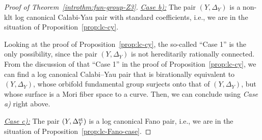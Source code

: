 \documentclass{amsart}
\theoremstyle{definition}
\theoremstyle{remark}
\numberwithin{equation}{section}
\begin{document}
\begin{proof}[Proof of Theorem~\ref{introthm:fun-group-Z3}]

\medskip

\noindent\underline{\textit{Case b):}}
The pair $(Y,\Delta_Y)$ is a non-klt log canonical Calabi-Yau pair with standard coefficients, i.e., we are in the situation of  Proposition~\ref{prop:lc-cy}. 

\medskip

Looking at the proof of Proposition~\ref{prop:lc-cy}, the so-called ``Case 1'' is the only possibility, since the pair $(Y,\Delta_Y)$ is not hereditarily rationally connected. From the discussion of that ``Case 1'' in the proof of Proposition~\ref{prop:lc-cy}, we can find a log canonical Calabi--Yau pair that is birationally equivalent to $(Y,\Delta_Y)$, whose orbifold fundamental group surjects onto that of $(Y,\Delta_Y)$, but whose surface is a Mori fiber space to a curve. Then, we can conclude using {\it Case a)} right above.

\medskip

\noindent\underline{\textit{Case c):}}
The pair $(Y,\Delta_Y^{\rm st})$ is a log canonical Fano pair, i.e., we are in the situation of Proposition~\ref{prop:lc-Fano-case}. 

\medskip


\end{proof}
\end{document}
